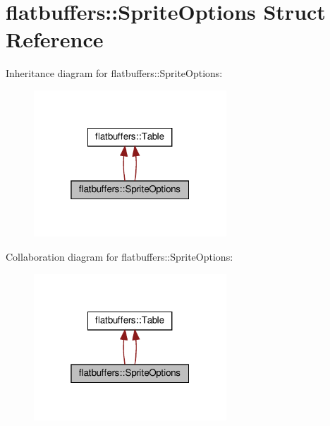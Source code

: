 \hypertarget{structflatbuffers_1_1SpriteOptions}{}\section{flatbuffers\+:\+:Sprite\+Options Struct Reference}
\label{structflatbuffers_1_1SpriteOptions}


Inheritance diagram for flatbuffers\+:\+:Sprite\+Options\+:
\nopagebreak
\begin{figure}[H]
\begin{center}
\leavevmode
\includegraphics[width=205pt]{structflatbuffers_1_1SpriteOptions__inherit__graph}
\end{center}
\end{figure}


Collaboration diagram for flatbuffers\+:\+:Sprite\+Options\+:
\nopagebreak
\begin{figure}[H]
\begin{center}
\leavevmode
\includegraphics[width=205pt]{structflatbuffers_1_1SpriteOptions__coll__graph}
\end{center}
\end{figure}
